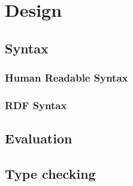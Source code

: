 
\chapter{Design} %

\section{Syntax}
\subsection{Human Readable Syntax}

\subsection{RDF Syntax}

\section{Evaluation}

\section{Type checking}
